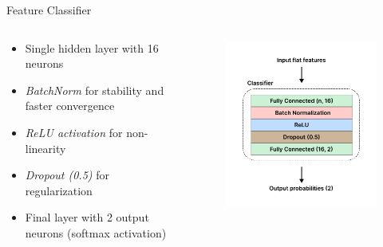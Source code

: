 \documentclass[aspectratio=169,8pt]{beamer}  %
\begin{document}
\begin{frame}{Feature Classifier}
\begin{columns}[T]
\begin{column}{0.6\textwidth}
\begin{itemize}
\item Single hidden layer with 16 neurons
\item \emph{BatchNorm} for stability and faster convergence
\item \emph{ReLU activation} for non-linearity
\item \emph{Dropout (0.5)} for regularization
\item Final layer with 2 output neurons (softmax activation)
\end{itemize}
\end{column}
\begin{column}{0.4\textwidth}
\begin{figure}
\includegraphics[width=\textwidth]{imgs/classifier_arch.png}
\end{figure}
\end{column}
\end{columns}
\end{frame}
\end{document}

